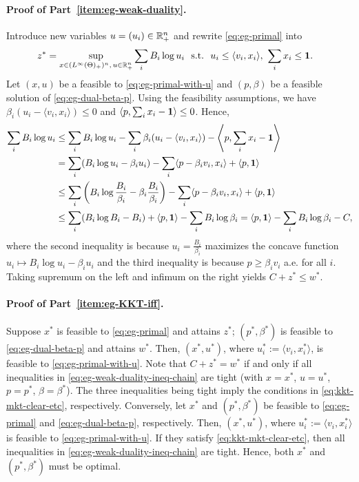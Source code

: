 	\paragraph{Proof of Part~\ref{item:eg-weak-duality}.}
	Introduce new variables $u = (u_i) \in \mathbb{R}_+^n$ and rewrite \eqref{eq:eg-primal} into 
	\begin{align}
			z^* = \sup_{x\in (L^\infty(\Theta)_+)^n,\, u\in \mathbb{R}_+^n}& \sum_i B_i \log u_i\ \
			{\rm s.t.}\  \ u_i \leq \langle v_i, x_i \rangle,\  \sum_i x_i \leq \mathbf{1}. 
		\label{eq:eg-primal-with-u}
	\end{align}
	Let $(x,u)$ be a feasible to \eqref{eq:eg-primal-with-u}
	and $(p, \beta)$ be a feasible solution of \eqref{eq:eg-dual-beta-p}. Using the feasibility assumptions, we have $\beta_i (u_i - \langle v_i, x_i \rangle) \leq 0$ and $\left\langle p, \sum_i x_i - \mathbf{1} \right\rangle \leq 0$. 
	Hence, 
	\begin{align}
		\sum_i B_i \log u_i  
		& \leq \sum_i B_i \log u_i - \sum_i \beta_i (u_i - \langle v_i, x_i\rangle) - \left\langle p, \sum_i x_i - \mathbf{1} \right\rangle \nonumber \\
		& = \sum_i (B_i \log u_i - \beta_i u_i) - \sum_i \langle p - \beta_i v_i, x_i \rangle + \langle p, \mathbf{1} \rangle \nonumber \\
		& \leq \sum_i \left(B_i \log \frac{B_i}{\beta_i} - \beta_i \frac{B_i}{\beta_i}\right) - \sum_i \langle p - \beta_i v_i, x_i \rangle + \langle p, \mathbf{1} \rangle \nonumber \\
		& \leq \sum_i (B_i \log B_i - B_i) + \langle p, \mathbf{1}\rangle - \sum_i B_i \log \beta_i = \langle p, \mathbf{1}\rangle - \sum_i B_i \log \beta_i - C,
		\label{eq:eg-weak-duality-ineq-chain}
	\end{align}
	where the second inequality is because $u_i = \frac{B_i}{\beta_i}$ maximizes the concave function 
	$ u_i \mapsto B_i \log u_i - \beta_i u_i$
	and the third inequality is because $p \geq \beta_i v_i$ a.e. for all $i$. 
	Taking supremum on the left and infimum on the right yields 
	$ C + z^* \leq w^*$.

	\paragraph{Proof of Part~\ref{item:eg-KKT-iff}.} 
	Suppose $x^*$ is feasible to \eqref{eq:eg-primal} and attains $z^*$; $(p^*, \beta^*)$ is feasible to \eqref{eq:eg-dual-beta-p} and attains $w^*$. 
	Then, $(x^*, u^*)$, where $u^*_i := \langle v_i, x^*_i \rangle$, is feasible to \eqref{eq:eg-primal-with-u}. Note that $C + z^* = w^*$ if and only if all inequalities in \eqref{eq:eg-weak-duality-ineq-chain} are tight (with $x = x^*$, $u = u^*$, $p = p^*$, $\beta = \beta^*$). The three inequalities being tight imply the conditions in \eqref{eq:kkt-mkt-clear-etc}, respectively.
	Conversely, let $x^*$ and $(p^*, \beta^*)$ be feasible to \eqref{eq:eg-primal} and \eqref{eq:eg-dual-beta-p}, respectively. Then, $(x^*, u^*)$, where $u^*_i := \langle v_i, x^*_i \rangle$ is feasible to \eqref{eq:eg-primal-with-u}. 
	If they satisfy \eqref{eq:kkt-mkt-clear-etc}, then all inequalities in \eqref{eq:eg-weak-duality-ineq-chain} are tight. 
	Hence, both $x^*$ and $(p^*, \beta^*)$ must be optimal.


